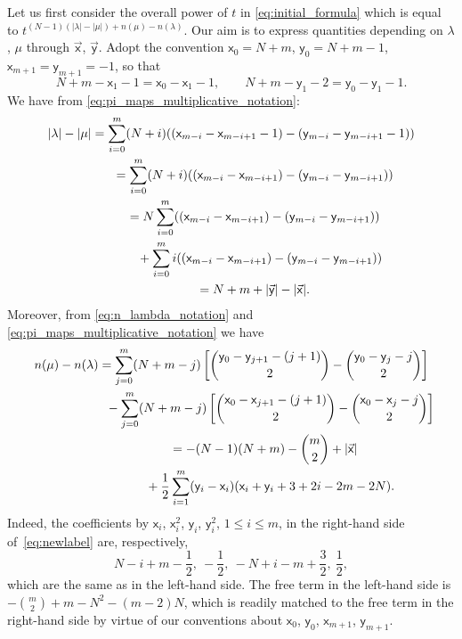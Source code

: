 \documentclass[11pt]{article}
\numberwithin{equation}{section}
\numberwithin{equation}{section}
\begin{document}
Let us first consider the overall power of $t$
in \eqref{eq:initial_formula}
which is equal to
$t^{(N-1)(|\lambda|-|\mu|)+n(\mu)-n(\lambda)}$.
Our aim is to express quantities
depending on $\lambda$, $\mu$ through
$\vec{\mathsf{x}}$, $\vec{\mathsf{y}}$.
Adopt the convention
$\mathsf{x}_0=N+m$,
$\mathsf{y}_0=N+m-1$,
$\mathsf{x}_{m+1}=\mathsf{y}_{m+1}=-1$,
so that
\begin{equation*}
	N+m-\mathsf{x}_1-1=\mathsf{x}_0-\mathsf{x}_1-1,\qquad
	N+m-\mathsf{y}_1-2=\mathsf{y}_0-\mathsf{y}_1-1.
\end{equation*}
We have from \eqref{eq:pi_maps_multiplicative_notation}:
\begin{gather*}
	|\lambda|-|\mu|	=
	\sum_{i=0}^{m}
	(N+i)
	(
	( \mathsf{x}_{m-i}-\mathsf{x}_{m-i+1}-1 )-
	( \mathsf{y}_{m-i}-\mathsf{y}_{m-i+1}-1)
)
	\\
\hphantom{|\lambda|-|\mu|}{}
=
	\sum_{i=0}^{m}
	(N+i)
	(
	( \mathsf{x}_{m-i}-\mathsf{x}_{m-i+1} )-
	( \mathsf{y}_{m-i}-\mathsf{y}_{m-i+1} )
)
	\\
\hphantom{|\lambda|-|\mu|}{}
=
	N\sum_{i=0}^{m}
	(
	( \mathsf{x}_{m-i}-\mathsf{x}_{m-i+1} )-
	( \mathsf{y}_{m-i}-\mathsf{y}_{m-i+1} )
	)\\
\hphantom{|\lambda|-|\mu|=}{}
	+
	\sum_{i=0}^{m}i
	(
	( \mathsf{x}_{m-i}-\mathsf{x}_{m-i+1} )-
	( \mathsf{y}_{m-i}-\mathsf{y}_{m-i+1})
	)
	\\
\hphantom{|\lambda|-|\mu|}{}
=
	N+m+
	|\vec {\mathsf{y}}|-|\vec{\mathsf{x}}|.
\end{gather*}
Moreover, from
\eqref{eq:n_lambda_notation} and \eqref{eq:pi_maps_multiplicative_notation}
we have
\begin{gather}
	\nonumber
	n(\mu)-n(\lambda)
	=
	\sum_{j=0}^{m}
	(N+m-j)
	\left[
		\binom{\mathsf{y}_0-\mathsf{y}_{j+1}-(j+1)}2-
		\binom{\mathsf{y}_0-\mathsf{y}_{j}-j}2
	\right]
	\\
\hphantom{n(\mu)-n(\lambda)=}{}
-
	\sum_{j=0}^{m}
	(N+m-j)
	\left[
		\binom{\mathsf{x}_0-\mathsf{x}_{j+1}-(j+1)}2-
		\binom{\mathsf{x}_0-\mathsf{x}_{j}-j}2
	\right]
\nonumber\\
\hphantom{n(\mu)-n(\lambda)}{}
=
	-(N-1)(N+m)
	-\binom{m}{2}
	+|\vec{\mathsf{x}}|\nonumber\\
\hphantom{n(\mu)-n(\lambda)=}{}
+
	\frac12
	\sum_{i=1}^{m}
	(\mathsf{y}_i-\mathsf{x}_i)(\mathsf{x}_i+\mathsf{y}_i+3+2i-2m-2N).
\label{eq:newlabel}
\end{gather}
Indeed, the coefficients
by $\mathsf{x}_i$, $\mathsf{x}_i^2$, $\mathsf{y}_i$, $\mathsf{y}_i^2$, $1\le i\le m$, in the right-hand side of~\eqref{eq:newlabel}
are, respectively,
\begin{equation*}
	N - i + m - \frac{1}{2}
	,\
	-\frac{1}{2}
	,\
	-N + i - m + \frac32
	,\
	\frac{1}{2},
\end{equation*}
which are the same as in the left-hand side.
The free term in the left-hand side is
$-\binom m2+m-N^2-(m-2)N$,
which is readily matched to the free term in the
right-hand side by virtue of
our conventions about
$\mathsf{x}_0$, $\mathsf{y}_0$, $\mathsf{x}_{m+1}$, $\mathsf{y}_{m+1}$.
\end{document}
